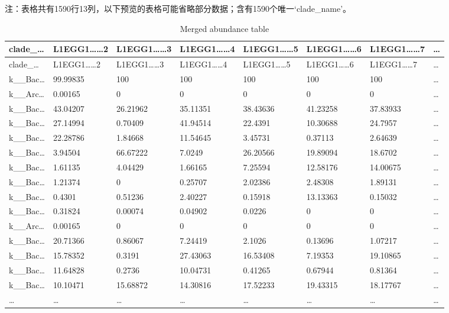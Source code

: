 \documentclass[
]{article}
\begin{document}
\begin{center}\begin{tcolorbox}[colback=gray!10, colframe=gray!50, width=0.9\linewidth, arc=1mm, boxrule=0.5pt]注：表格共有1590行13列，以下预览的表格可能省略部分数据；含有1590个唯一`clade\_name'。
\end{tcolorbox}
\end{center}

\begin{longtable}[]{@{}llllllll@{}}
\caption{\label{tab:Merged-abundance-table}Merged abundance table}\tabularnewline
\toprule
clade\_\ldots{} & L1EGG1\ldots\ldots2 & L1EGG1\ldots\ldots3 & L1EGG1\ldots\ldots4 & L1EGG1\ldots\ldots5 & L1EGG1\ldots\ldots6 & L1EGG1\ldots\ldots7 & \ldots{}\tabularnewline
\midrule
\endfirsthead
\toprule
clade\_\ldots{} & L1EGG1\ldots\ldots2 & L1EGG1\ldots\ldots3 & L1EGG1\ldots\ldots4 & L1EGG1\ldots\ldots5 & L1EGG1\ldots\ldots6 & L1EGG1\ldots\ldots7 & \ldots{}\tabularnewline
\midrule
\endhead
k\_\_Bac\ldots{} & 99.99835 & 100 & 100 & 100 & 100 & 100 & \ldots{}\tabularnewline
k\_\_Arc\ldots{} & 0.00165 & 0 & 0 & 0 & 0 & 0 & \ldots{}\tabularnewline
k\_\_Bac\ldots{} & 43.04207 & 26.21962 & 35.11351 & 38.43636 & 41.23258 & 37.83933 & \ldots{}\tabularnewline
k\_\_Bac\ldots{} & 27.14994 & 0.70409 & 41.94514 & 22.4391 & 10.30688 & 24.7957 & \ldots{}\tabularnewline
k\_\_Bac\ldots{} & 22.28786 & 1.84668 & 11.54645 & 3.45731 & 0.37113 & 2.64639 & \ldots{}\tabularnewline
k\_\_Bac\ldots{} & 3.94504 & 66.67222 & 7.0249 & 26.20566 & 19.89094 & 18.6702 & \ldots{}\tabularnewline
k\_\_Bac\ldots{} & 1.61135 & 4.04429 & 1.66165 & 7.25594 & 12.58176 & 14.00675 & \ldots{}\tabularnewline
k\_\_Bac\ldots{} & 1.21374 & 0 & 0.25707 & 2.02386 & 2.48308 & 1.89131 & \ldots{}\tabularnewline
k\_\_Bac\ldots{} & 0.4301 & 0.51236 & 2.40227 & 0.15918 & 13.13363 & 0.15032 & \ldots{}\tabularnewline
k\_\_Bac\ldots{} & 0.31824 & 0.00074 & 0.04902 & 0.0226 & 0 & 0 & \ldots{}\tabularnewline
k\_\_Arc\ldots{} & 0.00165 & 0 & 0 & 0 & 0 & 0 & \ldots{}\tabularnewline
k\_\_Bac\ldots{} & 20.71366 & 0.86067 & 7.24419 & 2.1026 & 0.13696 & 1.07217 & \ldots{}\tabularnewline
k\_\_Bac\ldots{} & 15.78352 & 0.3191 & 27.43063 & 16.53408 & 7.19353 & 19.10865 & \ldots{}\tabularnewline
k\_\_Bac\ldots{} & 11.64828 & 0.2736 & 10.04731 & 0.41265 & 0.67944 & 0.81364 & \ldots{}\tabularnewline
k\_\_Bac\ldots{} & 10.10471 & 15.68872 & 14.30816 & 17.52233 & 19.43315 & 18.17767 & \ldots{}\tabularnewline
\ldots{} & \ldots{} & \ldots{} & \ldots{} & \ldots{} & \ldots{} & \ldots{} & \ldots{}\tabularnewline
\bottomrule
\end{longtable}
\end{document}
